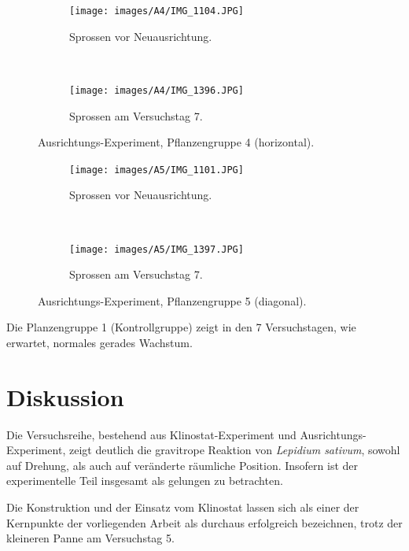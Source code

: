 \documentclass[
11pt, 
ngerman,
listof=totocnumbered,
oneside,
bibliography=totocnumbered,
abstracton
]{scrreprt}
\begin{document}
\begin{figure}[H]
	\centering
	\begin{subfigure}[b]{0.44\textwidth}
		\texttt{[image: images/A4/IMG\_1104.JPG]}
		\caption{Sprossen vor Neuausrichtung.\label{A41}}
		
	\end{subfigure}
	~ %
	\begin{subfigure}[b]{0.44\textwidth}
		\texttt{[image: images/A4/IMG\_1396.JPG]}
		\caption{Sprossen am Versuchstag 7.\label{A47}}
	\end{subfigure}
	\caption{Ausrichtungs-Experiment, Pflanzengruppe 4 (horizontal).\label{A4}}
\end{figure}

\begin{figure}[H]
	\centering
	\begin{subfigure}[b]{0.44\textwidth}
		\texttt{[image: images/A5/IMG\_1101.JPG]}
		\caption{Sprossen vor Neuausrichtung.\label{A51}}
		
	\end{subfigure}
	~ %
	\begin{subfigure}[b]{0.44\textwidth}
		\texttt{[image: images/A5/IMG\_1397.JPG]}
		\caption{Sprossen am Versuchstag 7.\label{A57}}
	\end{subfigure}
	\caption{Ausrichtungs-Experiment, Pflanzengruppe 5 (diagonal).\label{A5}}
\end{figure}

Die Planzengruppe 1 (Kontrollgruppe) zeigt in den 7 Versuchstagen, wie erwartet, normales gerades Wachstum. 

\section{Diskussion}

Die Versuchsreihe, bestehend aus Klinostat-Experiment und Ausrichtungs-Experiment, zeigt deutlich die gravitrope Reaktion von \emph{Lepidium sativum}, sowohl auf Drehung, als auch auf veränderte räumliche Position. Insofern ist der experimentelle Teil insgesamt als gelungen zu betrachten. 

Die Konstruktion und der Einsatz vom Klinostat lassen sich als einer der Kernpunkte der vorliegenden Arbeit als durchaus erfolgreich bezeichnen, trotz der kleineren Panne am Versuchstag 5.
\end{document}
